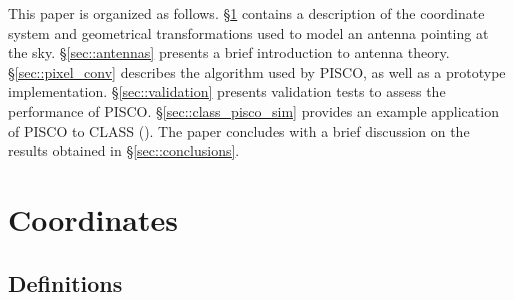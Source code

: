 \documentclass[a4paper,fleqn]{cas-dc}\sloppy
\begin{document}
	This paper is organized as follows. 
	\S\ref{sec::coordinate-systems} contains a description of the coordinate system and geometrical transformations used to model an antenna pointing at the sky.
	\S\ref{sec::antennas} presents a brief introduction to antenna theory. 
	\S\ref{sec::pixel_conv} describes the algorithm used by PISCO, as well as a prototype implementation. 
	\S\ref{sec::validation} presents validation tests to assess the performance of PISCO. 
	\S\ref{sec::class_pisco_sim} provides an example application of PISCO to CLASS (\cite{2016SPIE.9914E..1KH}). 
	The paper concludes with a brief discussion on the results obtained in \S\ref{sec::conclusions}.
	
	\section{Coordinates}
	\label{sec::coordinate-systems}
	
	\subsection{Definitions}
	
\end{document}
